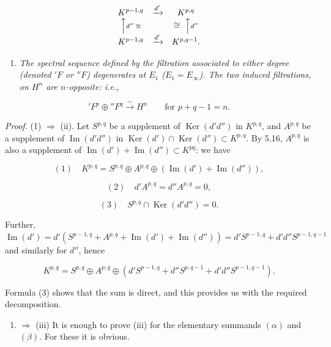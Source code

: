 \documentclass[
  english,
  a3paper,
  a3paper]{extarticle}
\providecommand{\tightlist}{%
  \setlength{\itemsep}{0pt}\setlength{\parskip}{0pt}}
\begin{document}
\[\begin{array}{ccc}K^{p-1,q}&\xrightarrow{d'}&K^{p,q}\\\Big\uparrow\scriptstyle{d''}\;\cong&&\cong\;\Big\uparrow\scriptstyle{d''}\\K^{p-1,q}&\xrightarrow{d'}&K^{p,q-1}.\end{array}\]

\begin{enumerate}
\def\labelenumi{(\roman{enumi})}
\setcounter{enumi}{2}
\tightlist
\item
  \emph{The spectral sequence defined by the filtration associated to
  either degree (denoted \({}'F\) or \({}''F\)) degenerates at \(E_1\)
  (\(E_1=E_\infty\)). The two induced filtrations, on \(H^n\) are
  \(n\)-opposite: i.e.,}
\end{enumerate}

\[{}'F^p\oplus{}''F^q\xrightarrow{\sim}H^n\qquad\text{for }p+q-1=n.\]

\emph{Proof.} (1) \(\Rightarrow\) (ii). Let \(S^{p,q}\) be a supplement
of \(\operatorname{Ker}(d'd'')\) in \(K^{p,q}\), and \(A^{p,q}\) be a
supplement of \(\operatorname{Im}(d'd'')\) in
\(\operatorname{Ker}(d')\cap\operatorname{Ker}(d'')\subset K^{p,q}\). By
5.16, \(A^{p,q}\) is also a supplement of
\(\operatorname{Im}(d')+\operatorname{Im}(d'')\subset K^{pq}\): we have

\[(1)\quad K^{p,q}=S^{p,q}\oplus A^{p,q}\oplus(\operatorname{Im}(d')+\operatorname{Im}(d'')),\]

\[(2)\quad d'A^{p,q}=d''A^{p,q}=0,\]

\[(3)\quad S^{p,q}\cap\operatorname{Ker}(d'd'')=0.\]

Further,
\(\operatorname{Im}(d')=d'(S^{p-1,q}+A^{p,q}+\operatorname{Im}(d')+\operatorname{Im}(d''))=d'S^{p-1,q}+d'd''S^{p-1,q-1}\)
and similarly for \(d''\), hence

\[K^{p,q}=S^{p,q}\oplus A^{p,q}\oplus(d'S^{p-1,q}+d''S^{p,q-1}+d'd''S^{p-1,q-1}).\]

Formula (3) shows that the sum is direct, and this provides us with the
required decomposition.

\begin{enumerate}
\def\labelenumi{(\roman{enumi})}
\setcounter{enumi}{1}
\tightlist
\item
  \(\Rightarrow\) (iii) It is enough to prove (iii) for the elementary
  summands \((\alpha)\) and \((\beta)\). For these it is obvious.
\end{enumerate}

\clearpage
\end{document}
